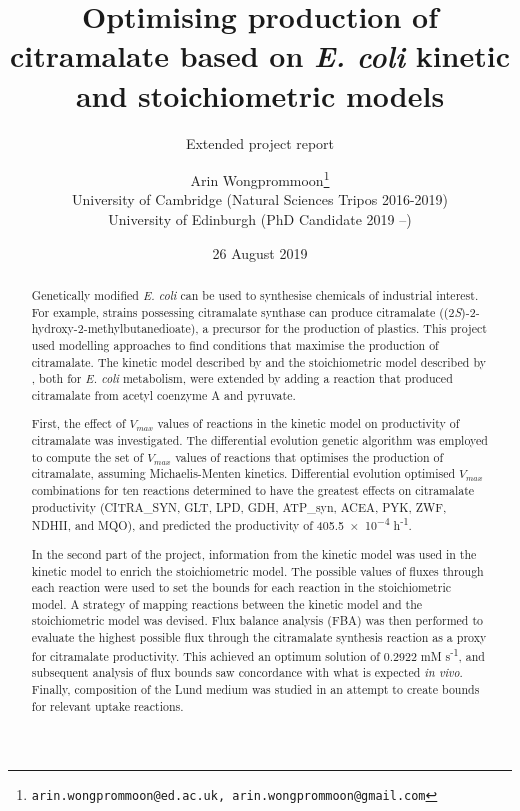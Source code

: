 \documentclass[parskip=full, numbers=noenddot]{scrreprt}
\author{Arin Wongprommoon\thanks{\texttt{arin.wongprommoon@ed.ac.uk, arin.wongprommoon@gmail.com}}
  \\University of Cambridge (Natural Sciences Tripos 2016-2019)
\\University of Edinburgh (PhD Candidate 2019 --)}
\title{Optimising production of citramalate based on \emph{E. coli} kinetic and stoichiometric models}
\subtitle{Extended project report}
\date{26 August 2019}
\begin{document}
\maketitle

\tableofcontents

\begin{abstract}

    Genetically modified \emph{E. coli} can be used to synthesise chemicals of industrial interest. For example, strains possessing citramalate synthase can produce citramalate ((2\emph{S})-2-hydroxy-2-methylbutanedioate), a precursor for the production of plastics.
  This project used modelling approaches to find conditions that maximise the production of citramalate. The kinetic model described by \citet{millard_metabolic_2017} and the stoichiometric model described by \citet{orth_comprehensive_2011}, both for \emph{E. coli} metabolism, were extended by adding a reaction that produced citramalate from acetyl coenzyme A and pyruvate.
  
  First, the effect of $V_{max}$ values of reactions in the kinetic model on productivity of citramalate was investigated. The differential evolution genetic algorithm was employed to compute the set of $V_{max}$ values of reactions that optimises the production of citramalate, assuming Michaelis-Menten kinetics. Differential evolution optimised $V_{max}$ combinations for ten reactions determined to have the greatest effects on citramalate productivity (CITRA\_SYN, GLT, LPD, GDH, ATP\_syn, ACEA, PYK, ZWF, NDHII, and MQO), and predicted the productivity of \num{405.5e-4} h\textsuperscript{-1}.

  In the second part of the project, information from the kinetic model was used in the kinetic model to enrich the stoichiometric model. The possible values of fluxes through each reaction were used to set the bounds for each reaction in the stoichiometric model. A strategy of mapping reactions between the kinetic model and the stoichiometric model was devised. Flux balance analysis (FBA) was then performed to evaluate the highest possible flux through the citramalate synthesis reaction as a proxy for citramalate productivity. This achieved an optimum solution of 0.2922 mM s\textsuperscript{-1}, and subsequent analysis of flux bounds saw concordance with what is expected \emph{in vivo}. Finally, composition of the Lund medium \citep{eastham_process_2015} was studied in an attempt to create bounds for relevant uptake reactions.
  
\end{abstract}
\end{document}
